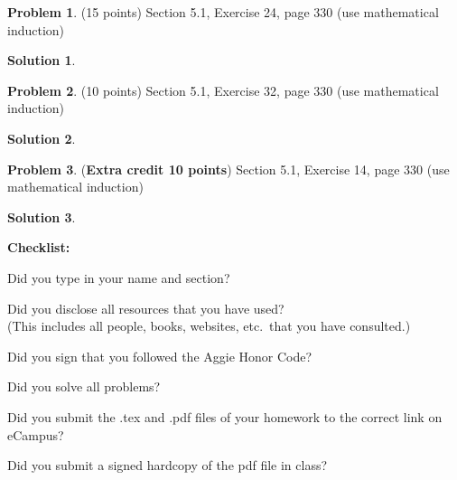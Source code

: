 \documentclass{article}
\theoremstyle{definition}
\newtheorem{problem}{Problem}
\newtheorem*{solution}{Solution}
\newcommand{\checklist}{\noindent\textbf{Checklist:}
\begin{compactitem}[$\Box$] 
\item Did you type in your name and section? 
\item Did you disclose all resources that you have used? \\
(This includes all people, books, websites, etc.\ that you have consulted.)
\item Did you sign that you followed the Aggie Honor Code? 
\item Did you solve all problems? 
\item Did you submit the .tex and .pdf files of your homework to the correct link on eCampus?
\item Did you submit a signed hardcopy of the pdf file in class? 
\end{compactitem}
}
\begin{document}
\begin{problem} (15 points)
Section 5.1, Exercise 24, page 330 (use mathematical induction)
\end{problem}
\begin{solution} 
\end{solution}

\begin{problem} (10 points)
Section 5.1, Exercise 32, page 330 (use mathematical induction)
\end{problem}
\begin{solution} 
\end{solution}

\begin{problem} (\textbf{Extra credit 10 points})
Section 5.1, Exercise 14, page 330 (use mathematical induction)
\end{problem}
\begin{solution} 
\end{solution}

\goodbreak
\checklist
\end{document}
